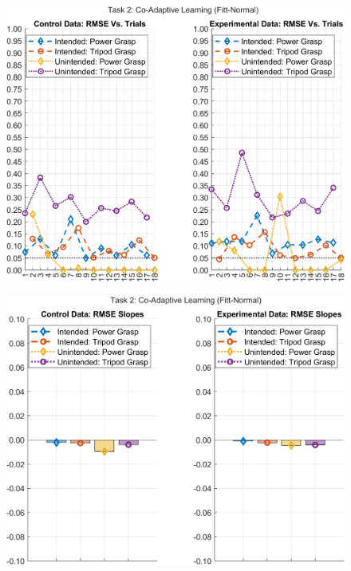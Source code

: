\documentclass[12pt]{article}
\newcommand\figWidth{7in}
\begin{document}
\begin{figure}
    \includegraphics[width = \figWidth]{t2-rmse-fnorm.png}
\end{figure}
\begin{figure}
    \includegraphics[width = \figWidth]{t2-bar-fnorm.png}
\end{figure}
\end{document}
